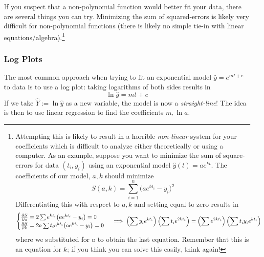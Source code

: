 If you suspect that a non-polynomial function would better fit your data, there are several things you can try. Minimizing the sum of squared-errors is likely very difficult for non-polynomial functions (there is likely no simple tie-in with linear equations/algebra).\footnote{%
	 Attempting this is likely to result in a horrible \emph{non-linear} system for your coefficients which is difficult to analyze either theoretically or using a computer. As an example, suppose you want to minimize the sum of square-errors for data $(t_i,y_i)$ using an exponential model $\hat y(t)=ae^{kt}$. The coefficients of our model, $a,k$ should minimize
	\[
		S(a,k)=\sum_{i=1}^n\big(ae^{kt_i}-y_i\big)^2
	\]
	Differentiating this with respect to $a,k$ and setting equal to zero results in
	\[
		\begin{cases}
			\partials[S]{a}=2\sum e^{kt_i}\big(ae^{kt_i}-y_i\big)=0 \\
			\partials[S]{k}=2a\sum t_ie^{kt_i}\big(ae^{kt_i}-y_i\big)=0
		\end{cases}
		\implies  \left(\sum y_ie^{kt_i}\right)\left(\sum t_ie^{2kt_i}\right)
		=\left(\sum e^{2kt_i}\right)\left(\sum t_iy_ie^{kt_i}\right)
	\]
	where we substituted for $a$ to obtain the last equation. Remember that this is an equation for $k$; if you think you can solve this easily, think again!
}

\subsubsection*{Log Plots}

The most common approach when trying to fit an exponential model $\hat y=e^{mt+c}$ to data is to use a log plot: taking logarithms of both sides results in
\[
	\ln\hat y=mt+c
\]
If we take $\hat Y:=\ln\hat y$ as a new variable, the model is now a \emph{straight-line}! The idea is then to use linear regression to find the coefficients $m,\ln a$.


